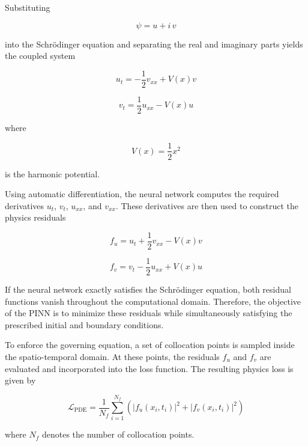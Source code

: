 \documentclass[11pt]{article}
\begin{document}
Substituting

\begin{equation}
	\psi=u+i\,v
\end{equation}

into the Schrödinger equation and separating the real and imaginary parts yields the coupled system

\begin{equation}
	u_t
	=
	-\frac{1}{2}v_{xx}
	+
	V(x)v
\end{equation}

\begin{equation}
	v_t
	=
	\frac{1}{2}u_{xx}
	-
	V(x)u
\end{equation}

where

\begin{equation}
	V(x)=\frac{1}{2}x^2
\end{equation}

is the harmonic potential.

Using automatic differentiation, the neural network computes the required derivatives $u_t$, $v_t$, $u_{xx}$, and $v_{xx}$. These derivatives are then used to construct the physics residuals

\begin{equation}
	f_u
	=
	u_t
	+
	\frac{1}{2}v_{xx}
	-
	V(x)v
\end{equation}

\begin{equation}
	f_v
	=
	v_t
	-
	\frac{1}{2}u_{xx}
	+
	V(x)u
\end{equation}

If the neural network exactly satisfies the Schrödinger equation, both residual functions 
vanish throughout the computational domain. Therefore, the objective of the PINN is to 
minimize these residuals while simultaneously satisfying the prescribed initial and boundary conditions.

To enforce the governing equation, a set of collocation points is sampled inside the 
spatio-temporal domain. At these points, the residuals $f_u$ and $f_v$ are evaluated 
and incorporated into the loss function. The resulting physics loss is given by

\begin{equation}
	\mathcal{L}_{\mathrm{PDE}}
	=
	\frac{1}{N_f}
	\sum_{i=1}^{N_f}
	\left(
	|f_u(x_i,t_i)|^2
	+
	|f_v(x_i,t_i)|^2
	\right)
\end{equation}

where $N_f$ denotes the number of collocation points.
\end{document}
